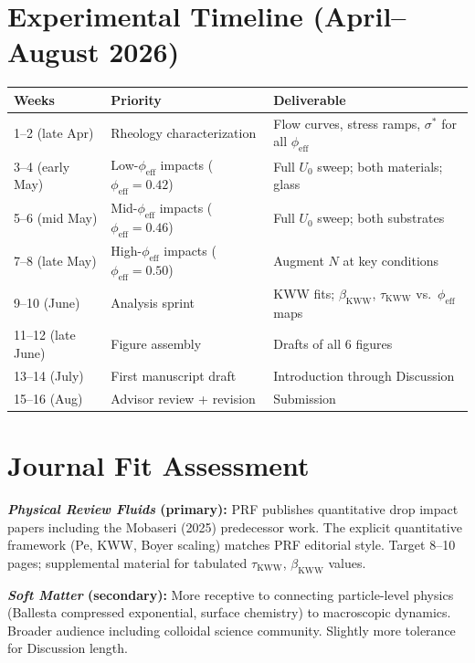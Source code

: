 \documentclass[11pt,letterpaper]{article}
\newcommand{\phieff}{\phi_{\mathrm{eff}}}
\newcommand{\taukww}{\tau_{\mathrm{KWW}}}
\newcommand{\bkww}{\beta_{\mathrm{KWW}}}
\newcommand{\sigstar}{\sigma^*}
\begin{document}
\section{Experimental Timeline (April--August 2026)}

\begin{center}
\begin{tabular}{lll}
  \toprule
  Weeks & Priority & Deliverable \\
  \midrule
  1--2 (late Apr) & Rheology characterization &
    Flow curves, stress ramps, $\sigstar$ for all $\phieff$ \\
  3--4 (early May) & Low-$\phieff$ impacts ($\phieff = 0.42$) &
    Full $U_0$ sweep; both materials; glass \\
  5--6 (mid May) & Mid-$\phieff$ impacts ($\phieff = 0.46$) &
    Full $U_0$ sweep; both substrates \\
  7--8 (late May) & High-$\phieff$ impacts ($\phieff = 0.50$) &
    Augment $N$ at key conditions \\
  9--10 (June) & Analysis sprint &
    KWW fits; $\bkww$, $\taukww$ vs.\ $\phieff$ maps \\
  11--12 (late June) & Figure assembly &
    Drafts of all 6 figures \\
  13--14 (July) & First manuscript draft &
    Introduction through Discussion \\
  15--16 (Aug) & Advisor review + revision &
    Submission \\
  \bottomrule
\end{tabular}
\end{center}

\section{Journal Fit Assessment}

\textbf{\textit{Physical Review Fluids} (primary):}
PRF publishes quantitative drop impact papers including the Mobaseri (2025)
predecessor work. The explicit quantitative framework (Pe, KWW, Boyer scaling)
matches PRF editorial style. Target 8--10 pages; supplemental material for
tabulated $\taukww$, $\bkww$ values.

\textbf{\textit{Soft Matter} (secondary):}
More receptive to connecting particle-level physics (Ballesta compressed
exponential, surface chemistry) to macroscopic dynamics. Broader audience
including colloidal science community. Slightly more tolerance for Discussion
length.
\end{document}

